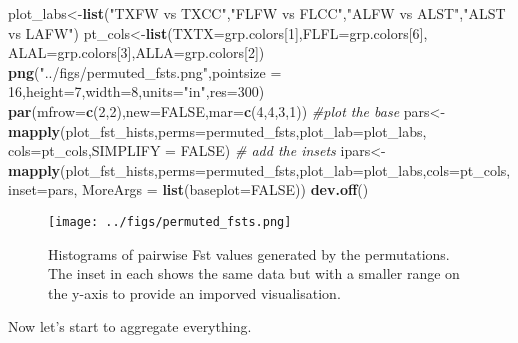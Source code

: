 \documentclass[11pt,]{article}
\newenvironment{Shaded}{\begin{snugshade}}{\end{snugshade}}
\newcommand{\KeywordTok}[1]{\textcolor[rgb]{0.13,0.29,0.53}{\textbf{#1}}}
\newcommand{\DataTypeTok}[1]{\textcolor[rgb]{0.13,0.29,0.53}{#1}}
\newcommand{\DecValTok}[1]{\textcolor[rgb]{0.00,0.00,0.81}{#1}}
\newcommand{\StringTok}[1]{\textcolor[rgb]{0.31,0.60,0.02}{#1}}
\newcommand{\CommentTok}[1]{\textcolor[rgb]{0.56,0.35,0.01}{\textit{#1}}}
\newcommand{\OtherTok}[1]{\textcolor[rgb]{0.56,0.35,0.01}{#1}}
\newcommand{\NormalTok}[1]{#1}
\begin{document}
\begin{Shaded}
\begin{Highlighting}[]
\NormalTok{plot_labs<-}\KeywordTok{list}\NormalTok{(}\StringTok{"TXFW vs TXCC"}\NormalTok{,}\StringTok{"FLFW vs FLCC"}\NormalTok{,}\StringTok{"ALFW vs ALST"}\NormalTok{,}\StringTok{"ALST vs LAFW"}\NormalTok{)}
\NormalTok{pt_cols<-}\KeywordTok{list}\NormalTok{(}\DataTypeTok{TXTX=}\NormalTok{grp.colors[}\DecValTok{1}\NormalTok{],}\DataTypeTok{FLFL=}\NormalTok{grp.colors[}\DecValTok{6}\NormalTok{],}
              \DataTypeTok{ALAL=}\NormalTok{grp.colors[}\DecValTok{3}\NormalTok{],}\DataTypeTok{ALLA=}\NormalTok{grp.colors[}\DecValTok{2}\NormalTok{])}
\KeywordTok{png}\NormalTok{(}\StringTok{"../figs/permuted_fsts.png"}\NormalTok{,}\DataTypeTok{pointsize =} \DecValTok{16}\NormalTok{,}\DataTypeTok{height=}\DecValTok{7}\NormalTok{,}\DataTypeTok{width=}\DecValTok{8}\NormalTok{,}\DataTypeTok{units=}\StringTok{"in"}\NormalTok{,}\DataTypeTok{res=}\DecValTok{300}\NormalTok{)}
\KeywordTok{par}\NormalTok{(}\DataTypeTok{mfrow=}\KeywordTok{c}\NormalTok{(}\DecValTok{2}\NormalTok{,}\DecValTok{2}\NormalTok{),}\DataTypeTok{new=}\OtherTok{FALSE}\NormalTok{,}\DataTypeTok{mar=}\KeywordTok{c}\NormalTok{(}\DecValTok{4}\NormalTok{,}\DecValTok{4}\NormalTok{,}\DecValTok{3}\NormalTok{,}\DecValTok{1}\NormalTok{))}
\CommentTok{#plot the base}
\NormalTok{pars<-}\KeywordTok{mapply}\NormalTok{(plot_fst_hists,}\DataTypeTok{perms=}\NormalTok{permuted_fsts,}\DataTypeTok{plot_lab=}\NormalTok{plot_labs,}
             \DataTypeTok{cols=}\NormalTok{pt_cols,}\DataTypeTok{SIMPLIFY =} \OtherTok{FALSE}\NormalTok{)}
\CommentTok{# add the insets}
\NormalTok{ipars<-}\KeywordTok{mapply}\NormalTok{(plot_fst_hists,}\DataTypeTok{perms=}\NormalTok{permuted_fsts,}\DataTypeTok{plot_lab=}\NormalTok{plot_labs,}\DataTypeTok{cols=}\NormalTok{pt_cols,}
              \DataTypeTok{inset=}\NormalTok{pars,}
              \DataTypeTok{MoreArgs =} \KeywordTok{list}\NormalTok{(}\DataTypeTok{baseplot=}\OtherTok{FALSE}\NormalTok{))}
\KeywordTok{dev.off}\NormalTok{()}
\end{Highlighting}
\end{Shaded}

\begin{figure}
\centering
\texttt{[image: ../figs/permuted\_fsts.png]}
\caption{Histograms of pairwise Fst values generated by the
permutations. The inset in each shows the same data but with a smaller
range on the y-axis to provide an imporved visualisation.}
\end{figure}

Now let's start to aggregate everything.
\end{document}
